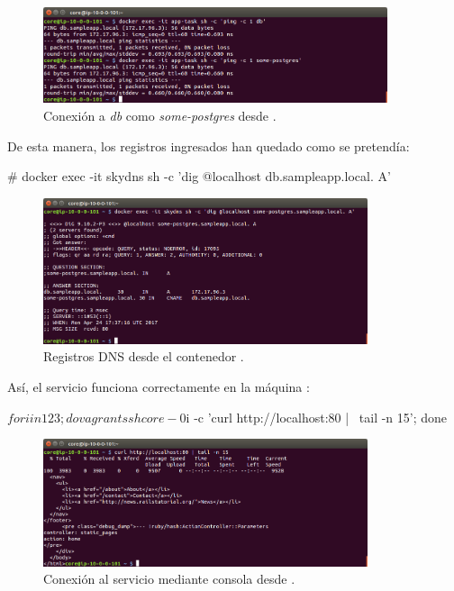 \begin{figure}[H]
\centering
\includegraphics[width=0.9\textwidth]{images/figures/skydns-ping.png}
\caption{Conexión a \textit{db} como \textit{some-postgres} desde .}
\end{figure}

De esta manera, los registros ingresados han quedado como se pretendía:

\begin{code}
# docker exec -it skydns sh -c 'dig @localhost db.sampleapp.local. A'
\end{code}

\begin{figure}[H]
\centering
\includegraphics[width=0.85\textwidth]{images/figures/skydns-dig.png}
\caption{Registros DNS desde el contenedor .}
\end{figure}

Así, el servicio funciona correctamente en la máquina :
\begin{code}
$ for i in 1 2 3; do vagrant ssh core-0$i -c 'curl http://localhost:80 | \
  tail -n 15'; done
\end{code}

\begin{figure}[H]
\centering
\includegraphics[width=0.85\textwidth]{images/figures/skydns-curl.png}
\caption{Conexión al servicio mediante consola desde \kode{core-01}.}
\end{figure}


